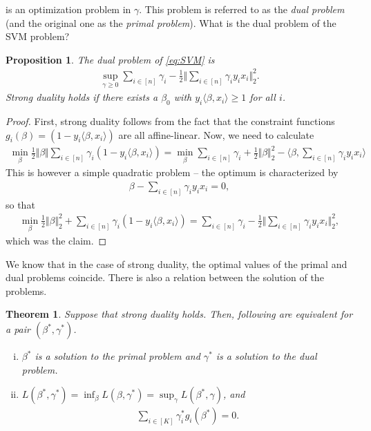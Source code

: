 \documentclass{article}
\newcommand{\sprod}[1]{\langle #1 \rangle}
\newtheorem{theorem}{Theorem}
\newtheorem{prop}{Proposition}
\newcommand{\norm}[1]{\Vert #1 \Vert}
\begin{document}
is an optimization problem in $\gamma$. This problem is referred to as the \emph{dual problem} (and the original one as the \emph{primal problem}). What is the dual problem of the SVM problem?
\begin{prop}
    The dual problem of \eqref{eq:SVM} is
    \begin{align*}
        \sup_{\gamma \geq 0 } \sum_{i \in [n]} \gamma_i - \tfrac{1}{2} \norm{\sum_{i \in [n]}\gamma_i y_i x_i}_2^2.
    \end{align*}
    Strong duality holds if there exists a $\beta_0$ with $y_i\sprod{\beta,x_i} \geq 1$ for all $i$.
\end{prop}
\begin{proof}
First, strong duality follows from the fact that the constraint functions $g_i(\beta)=(1-y_i\sprod{\beta,x_i})$ are all affine-linear. Now, we need to calculate
    \begin{align*}
        \min_\beta \tfrac{1}{2}\norm{\beta} \sum_{i \in [n]} \gamma_i(1-y_i\sprod{\beta,x_i}) = \min_{\beta} \sum_{i \in [n]} \gamma_i + \tfrac{1}{2}\norm{\beta}_2^2 - \sprod{\beta, \sum_{i\in [n]}\gamma_i y_i x_i}
    \end{align*}
    This is however a simple quadratic problem -- the optimum is characterized by
    \begin{align*}
        \beta - \sum_{i\in [n]} \gamma_i y_i x_i =0,
    \end{align*}
    so that
    \begin{align*}
        \min_\beta \tfrac{1}{2}\norm{\beta}_2^2 + \sum_{i \in [n]} \gamma_i(1-y_i\sprod{\beta,x_i}) =  \sum_{i \in [n]} \gamma_i - \tfrac{1}{2} \norm{\sum_{i \in [n]}\gamma_i y_i x_i}_2^2,
    \end{align*}
    which was the claim.
\end{proof}

We know that in the case of strong duality, the optimal values of the primal and dual problems coincide. There is also a relation between the solution of the problems.
\begin{theorem}
    Suppose that strong duality holds. Then, following are equivalent for a pair $(\beta^*,\gamma^*)$.
    \begin{enumerate}[(i)]
        \item $\beta^*$ is a solution to the primal problem and $\gamma^*$ is a solution to the dual problem.
        \item $L(\beta^*,\gamma^*) = \inf_{\beta} L(\beta,\gamma^*) = \sup_\gamma L(\beta^*,\gamma)$, and 
            \begin{align}
    \sum_{i \in [K]} \gamma_i^* g_i(\beta^*)=0 \label{eq:slackness}.
    \end{align}
    \end{enumerate}
\end{theorem}
\end{document}
